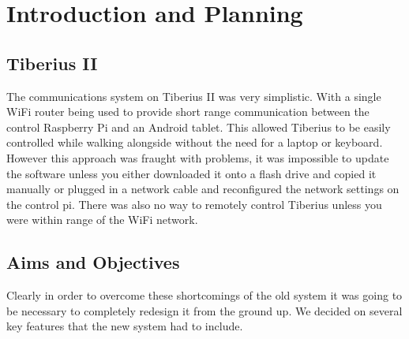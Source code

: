 \section{Introduction and Planning}
\subsection{Tiberius II}
The communications system on Tiberius II was very simplistic. With a single WiFi router being used to provide short range communication between the control Raspberry Pi and an Android tablet. This allowed Tiberius to be easily controlled while walking alongside without the need for a laptop or keyboard.
\newline
However this approach was fraught with problems, it was impossible to update the software unless you either downloaded it onto a flash drive and copied it manually or plugged in a network cable and reconfigured the network settings on the control pi. There was also no way to remotely control Tiberius unless you were within range of the WiFi network.



\subsection{Aims and Objectives}
Clearly in order to overcome these shortcomings of the old system it was going to be necessary to completely redesign it from the ground up. 
\newline
We decided on several key features that the new system had to include.

